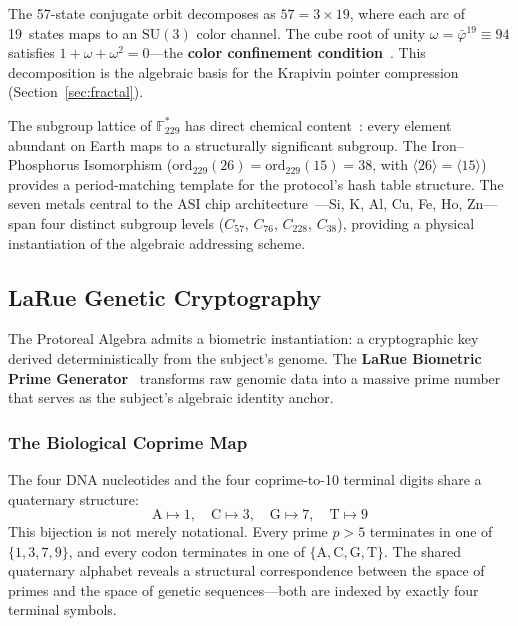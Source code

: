 \documentclass[12pt,a4paper]{article}
\begin{document}
The 57-state conjugate orbit decomposes as $57 = 3 \times 19$, where each arc of 19~states maps to an $\mathrm{SU}(3)$ color channel. The cube root of unity $\omega = \bar{\varphi}^{19} \equiv 94$ satisfies $1 + \omega + \omega^2 = 0$---the \textbf{color confinement condition}~\cite{PP-I-Ch5}. This decomposition is the algebraic basis for the Krapivin pointer compression (Section~\ref{sec:fractal}).

The subgroup lattice of $\mathbb{F}_{229}^*$ has direct chemical content~\cite{PP-II-Ch20}: every element abundant on Earth maps to a structurally significant subgroup. The Iron--Phosphorus Isomorphism ($\mathrm{ord}_{229}(26) = \mathrm{ord}_{229}(15) = 38$, with $\langle 26 \rangle = \langle 15 \rangle$) provides a period-matching template for the protocol's hash table structure. The seven metals central to the ASI chip architecture~\cite{PP-II-Ch19}---Si, K, Al, Cu, Fe, Ho, Zn---span four distinct subgroup levels ($C_{57}$, $C_{76}$, $C_{228}$, $C_{38}$), providing a physical instantiation of the algebraic addressing scheme.

\subsection{LaRue Genetic Cryptography}
\label{subsec:genetic-crypto}

The Protoreal Algebra admits a biometric instantiation: a cryptographic key derived deterministically from the subject's genome. The \textbf{LaRue Biometric Prime Generator}~\cite{PP-III-Ch22} transforms raw genomic data into a massive prime number that serves as the subject's algebraic identity anchor.

\subsubsection{The Biological Coprime Map}

The four DNA nucleotides and the four coprime-to-10 terminal digits share a quaternary structure:
\begin{equation}
\label{eq:coprime-map}
\mathrm{A} \mapsto 1, \quad \mathrm{C} \mapsto 3, \quad \mathrm{G} \mapsto 7, \quad \mathrm{T} \mapsto 9
\end{equation}
This bijection is not merely notational. Every prime $p > 5$ terminates in one of $\{1,3,7,9\}$, and every codon terminates in one of $\{\mathrm{A},\mathrm{C},\mathrm{G},\mathrm{T}\}$. The shared quaternary alphabet reveals a structural correspondence between the space of primes and the space of genetic sequences---both are indexed by exactly four terminal symbols.
\end{document}
